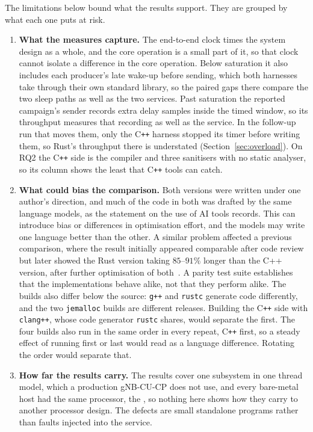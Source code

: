 \documentclass[english,oneside,a4paper,censored,csm,software-track-2020]{HYthesisML}
\begin{document}
The limitations below bound what the results support. They are grouped by what
each one puts at risk.

\begin{enumerate}[label=\textbf{\arabic*.}, leftmargin=1.6em, itemsep=0.6ex, topsep=0.5ex,
  parsep=0pt]
\item \textbf{What the measures capture.} The end-to-end clock times the system design as a whole,
and the core operation is a small part of it, so that clock cannot isolate a
difference in the core operation. Below saturation it also includes each producer's late
wake-up before sending, which both harnesses take through their own standard library, so the
paired gaps there compare the two sleep paths as well as the two services. Past saturation
the reported campaign's sender
records extra delay samples inside the timed window, so its throughput measures
that recording as well as the service. In the follow-up run that moves them, only
the C\texttt{++} harness stopped its timer before writing them, so Rust's
throughput there is understated (Section~\ref{sec:overload}). On RQ2 the
C\texttt{++} side is the compiler and three sanitisers with no static analyser, so
its column shows the least that C\texttt{++} tools can catch.

\item \textbf{What could bias the comparison.} Both versions were written under one author's direction,
and much of the code in both was drafted by the same language models, as the
statement on the use of AI tools records. This can introduce bias or differences
in optimisation effort, and the models may write one language better than the
other. A similar problem affected a previous comparison, where the result
initially appeared comparable after code review but later showed the Rust version taking
$85$--$91\%$ longer than the C++ version, after further optimisation of both~\cite{emberg2023asn1}. A
parity test suite establishes that the implementations behave alike, not that
they perform alike. The builds also differ below the source: \texttt{g++} and
\texttt{rustc} generate code differently, and the two \texttt{jemalloc} builds
are different releases. Building the C\texttt{++} side with \texttt{clang++},
whose code generator \texttt{rustc} shares, would separate the first. The four builds also
run in the same order in every repeat, C\texttt{++} first, so a steady effect of running
first or last would read as a language difference. Rotating the order would separate that.

\item \textbf{How far the results carry.} The results cover one subsystem in one thread model,
which a production gNB-CU-CP does not use, and every bare-metal host had the same
processor, the \MainCpu{}, so nothing here shows how they carry to another
processor design. The defects are small standalone programs rather than faults
injected into the service.


\end{enumerate}
\end{document}
